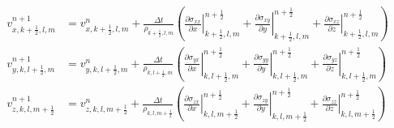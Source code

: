 \documentclass[pdftex,a4paper,parskip,listof=totoc,bibliography=totoc,onehalfspacing,12pt]{scrreprt}
\begin{document}
\begin{align*}
	v_{x,k+\frac{1}{2},l,m}^{n+1} &= v_{x,k+\frac{1}{2},l,m}^n + \frac{\Delta t}{\rho_{k+\frac{1}{2},l,m}}  \left( \left.\frac{\partial\sigma_{xx}}{\partial x}\right\rvert_{k+\frac{1}{2},l,m}^{n+\frac{1}{2}} + \left.\frac{\partial\sigma_{xy}}{\partial y}\right\rvert_{k+\frac{1}{2},l,m}^{n+\frac{1}{2}} + \left.\frac{\partial\sigma_{xz}}{\partial z}\right\rvert_{k+\frac{1}{2},l,m}^{n+\frac{1}{2}} \right)\\
	v_{y,k,l+\frac{1}{2},m}^{n+1} &= v_{y,k,l+\frac{1}{2},m}^n + \frac{\Delta t}{\rho_{k,l+\frac{1}{2},m}}  \left( \left.\frac{\partial\sigma_{yx}}{\partial x}\right\rvert_{k,l+\frac{1}{2},m}^{n+\frac{1}{2}} + \left.\frac{\partial\sigma_{yy}}{\partial y}\right\rvert_{k,l+\frac{1}{2},m}^{n+\frac{1}{2}} + \left.\frac{\partial\sigma_{yz}}{\partial z}\right\rvert_{k,l+\frac{1}{2},m}^{n+\frac{1}{2}} \right)\\
	v_{z,k,l,m+\frac{1}{2}}^{n+1} &= v_{z,k,l,m+\frac{1}{2}}^n + \frac{\Delta t}{\rho_{k,l,m+\frac{1}{2}}}  \left( \left.\frac{\partial\sigma_{zx}}{\partial x}\right\rvert_{k,l,m+\frac{1}{2}}^{n+\frac{1}{2}} + \left.\frac{\partial\sigma_{zy}}{\partial y}\right\rvert_{k,l,m+\frac{1}{2}}^{n+\frac{1}{2}} + \left.\frac{\partial\sigma_{zz}}{\partial z}\right\rvert_{k,l,m+\frac{1}{2}}^{n+\frac{1}{2}} \right)
\end{align*}
\end{document}
